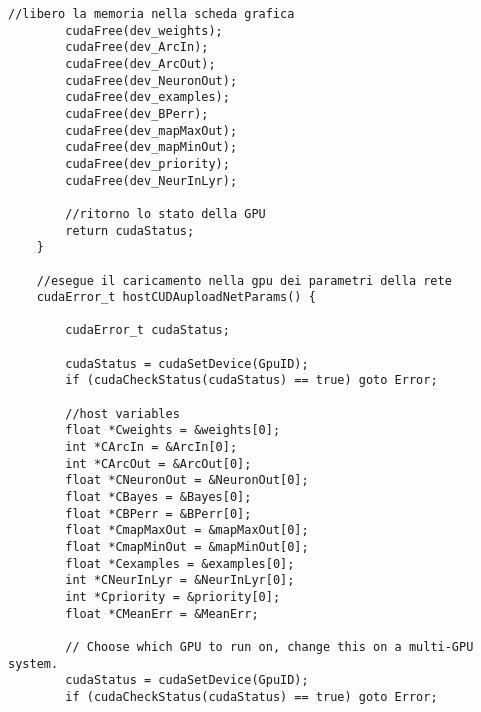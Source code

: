 \documentclass[10pt,a4paper]{article}
\begin{document}
\begin{lstlisting}[style=mycuda, caption=librerie usate, captionpos=b]
		//libero la memoria nella scheda grafica
		cudaFree(dev_weights);
		cudaFree(dev_ArcIn);
		cudaFree(dev_ArcOut);
		cudaFree(dev_NeuronOut);
		cudaFree(dev_examples);
		cudaFree(dev_BPerr);
		cudaFree(dev_mapMaxOut);
		cudaFree(dev_mapMinOut);
		cudaFree(dev_priority);
		cudaFree(dev_NeurInLyr);

		//ritorno lo stato della GPU
		return cudaStatus;
	}

	//esegue il caricamento nella gpu dei parametri della rete
	cudaError_t hostCUDAuploadNetParams() {

		cudaError_t cudaStatus;

		cudaStatus = cudaSetDevice(GpuID);
		if (cudaCheckStatus(cudaStatus) == true) goto Error;

		//host variables
		float *Cweights = &weights[0];
		int *CArcIn = &ArcIn[0];
		int *CArcOut = &ArcOut[0];
		float *CNeuronOut = &NeuronOut[0];
		float *CBayes = &Bayes[0];
		float *CBPerr = &BPerr[0];
		float *CmapMaxOut = &mapMaxOut[0];
		float *CmapMinOut = &mapMinOut[0];
		float *Cexamples = &examples[0];
		int *CNeurInLyr = &NeurInLyr[0];
		int *Cpriority = &priority[0];
		float *CMeanErr = &MeanErr;

		// Choose which GPU to run on, change this on a multi-GPU system.
		cudaStatus = cudaSetDevice(GpuID);
		if (cudaCheckStatus(cudaStatus) == true) goto Error;


\end{lstlisting}
\end{document}
